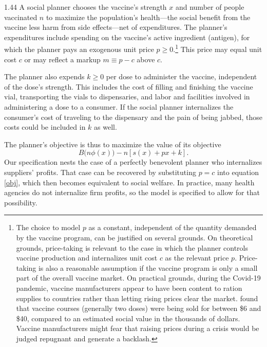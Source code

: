 \documentclass[12pt]{article}
\newcommand{\efficacy}{\phi}
\newcommand{\side}{s}
\newcommand{\benefit}{B}
\begin{document}
\begin{spacing}{1.44}
A social planner chooses the vaccine's strength $x$ and number of
people vaccinated $n$ to maximize the population's health---the social
benefit from the vaccine less harm from side effects---net of
expenditures. The planner's expenditures include spending on the
vaccine's active ingredient (antigen), for which the planner pays an
exogenous unit price $p \geq 0$.\footnote{\label{fn:Castillo} The
choice to model $p$ as a constant, independent of the quantity
demanded by the vaccine program, can be justified on several
grounds. On theoretical grounds, price-taking is relevant to the case
in which the planner controls vaccine production and internalizes unit
cost $c$ as the relevant price $p$. Price-taking is also a reasonable
assumption if the vaccine program is only a small part of the overall
vaccine market. On practical grounds, during the Covid-19 pandemic,
vaccine manufacturers appear to have been content to ration supplies
to countries rather than letting rising prices clear the
market. \citet{Castillo2021} found that vaccine courses (generally two
doses) were being sold for between \$6 and \$40, compared to an
estimated social value in the thousands of dollars. Vaccine
manufacturers might fear that raising prices during a crisis would be
judged repugnant \citep{Kahneman1986} and generate a backlash.}  This
price may equal unit cost $c$ or may reflect a markup $m \equiv
p -c$ above $c$.

The planner also expends $k \geq 0$ per dose to administer the
vaccine, independent of the dose's strength. This includes the cost of
filling and finishing the vaccine vial, transporting the vials to
dispensaries, and labor and facilities involved in administering a
dose to a consumer. If the social planner internalizes the consumer's
cost of traveling to the dispensary and the pain of being jabbed,
those costs could be included in $k$ as well.

The planner's objective is thus to maximize the value of its objective
\begin{equation}
\label{obj}
\benefit \bigl( n\efficacy(x) \bigr) - n \left[ \side(x) + px + k
  \right].
\end{equation}
Our specification nests the case of a perfectly benevolent planner who
internalizes suppliers' profits. That case can be recovered by
substituting $p = c$ into equation \eqref{obj}, which then becomes
equivalent to social welfare. In practice, many health agencies do not
internalize firm profits, so the model is specified to allow for that
possibility.


\end{spacing}
\end{document}
